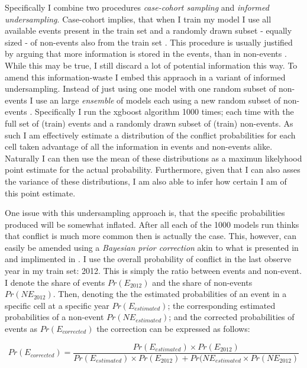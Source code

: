 \documentclass[a4paper]{article}
\begin{document}
Specifically I combine two procedures \emph{case-cohort sampling} and \emph{informed undersampling}. Case-cohort implies, that when I train my model I use all available events present in the train set and a randomly drawn subset - equally sized - of non-events also from the train set  \citep[142]{King_Zeng_2001}. This procedure is usually justified by arguing that more information is stored in the events, than in non-events \cite[139]{King_Zeng_2001}. While this may be true, I still discard a lot of potential information this way. To amend this information-waste I embed this appraoch in a variant of informed undersampling. Instead of just using one model with one random subset of non-events I use an large \emph{ensemble} of models each using a new random subset of non-events \cite[1267]{He_2008}. Specifically I run the xgboost algorithm 1000 times; each time with the full set of (train) events and a randomly drawn subset of (train) non-events. As such I am effectively estimate a distribution of the conflict probabilities for each cell taken advantage of all the information in events and non-events alike. Naturally I can then use the mean of these distributions as a maximun likelyhood point estimate for the actual probability. Furthermore, given that I can also asses the variance of these distributions, I am also able to infer how certain I am of this point estimate.\par 

One issue with this undersampling approach is, that the specific probabilities produced will be somewhat inflated. After all each of the 1000 models run thinks that conflict is much more common then is actually the case. This, however, can easily be amended using a \emph{Bayesian prior correction} akin to what is presented in \cite{King_Zeng_2001, king_zeng_2001b} and implimented in \cite{Goldstone_2010}. I use the overall probability of conflict in the last observe year in my train set: 2012. This is simply the ratio between events and non-event. I denote the share of events $Pr(E_{2012})$ and the share of non-events $Pr(NE_{2012})$. Then, denoting the the estimated probabilities of an event in a specific cell at a specific year $Pr(E_{estimated})$; the corresponding estimated probabilities of a non-event $Pr(NE_{estimated})$; and the corrected probabilities of events as $Pr(E_{corrected})$ the correction can be expressed as follows:

\[
Pr(E_{corrected}) = \frac{Pr(E_{estimated}) \times Pr(E_{2012})}{Pr(E_{estimated}) \times Pr(E_{2012})+Pr(NE_{estimated} \times Pr(NE_{2012})} \tag{14} \label{eq:bayesC}
\]
\end{document}
